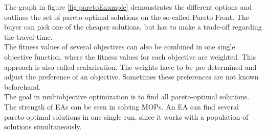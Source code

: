     The graph in figure \ref{fig:paretoExample} demonstrates the different options and outlines the set of pareto-optimal solutions on the so-called Pareto Front. The buyer can pick one of the cheaper solutions, but has to make a trade-off regarding the travel-time.\\
    The fitness values of several objectives can also be combined in one single objective function, where the fitness values for each objective are weighted. This approach is also called scalarisation\cite{Eiben}. The weights have to be pre-determined and adjust the preference of an objective. Sometimes these preferences are not known beforehand.\\
    The goal in multiobjective optimization is to find all pareto-optimal solutions. The strength of EAs can be seen in solving MOPs. An EA can find several pareto-optimal solutions in one single run, since it works with a population of solutions simultaneously\cite{Deb:2002}.
    
